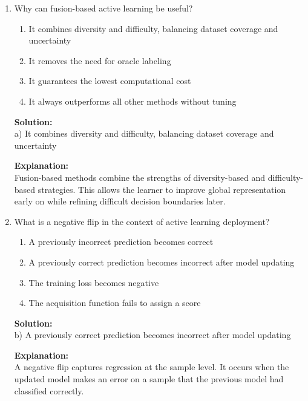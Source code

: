 \documentclass{article}
\begin{document}
\begin{enumerate}
\vspace{1em}

\item Why can fusion-based active learning be useful?

\begin{enumerate}
    \item It combines diversity and difficulty, balancing dataset coverage and uncertainty
    \item It removes the need for oracle labeling
    \item It guarantees the lowest computational cost
    \item It always outperforms all other methods without tuning
\end{enumerate}

\textbf{Solution:} \\
a) It combines diversity and difficulty, balancing dataset coverage and uncertainty

\textbf{Explanation:} \\
Fusion-based methods combine the strengths of diversity-based and difficulty-based strategies. This allows the learner to improve global representation early on while refining difficult decision boundaries later.

\vspace{1em}

\item What is a negative flip in the context of active learning deployment?

\begin{enumerate}
    \item A previously incorrect prediction becomes correct
    \item A previously correct prediction becomes incorrect after model updating
    \item The training loss becomes negative
    \item The acquisition function fails to assign a score
\end{enumerate}

\textbf{Solution:} \\
b) A previously correct prediction becomes incorrect after model updating

\textbf{Explanation:} \\
A negative flip captures regression at the sample level. It occurs when the updated model makes an error on a sample that the previous model had classified correctly.

\vspace{1em}


\end{enumerate}
\end{document}
